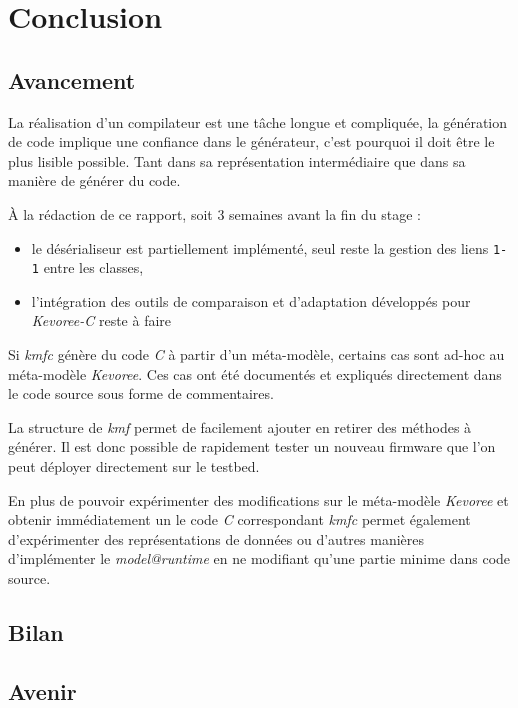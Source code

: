 \section*{Conclusion}
{}


\subsection*{Avancement}
{}
La réalisation d'un compilateur est une tâche longue et compliquée, la génération de code implique une confiance dans le générateur, c'est pourquoi il doit être le plus lisible possible. Tant dans sa représentation intermédiaire que dans sa manière de générer du code.

À la rédaction de ce rapport, soit 3 semaines avant la fin du stage :
\begin{itemize}
\item le désérialiseur est partiellement implémenté, seul reste la gestion des liens \texttt{1-1} entre les classes,
\item l'intégration des outils de comparaison et d'adaptation développés pour \emph{Kevoree-C} reste à faire
\end{itemize}

Si \emph{kmfc} génère du code \emph{C} à partir d'un méta-modèle, certains cas sont ad-hoc au méta-modèle \emph{Kevoree}. Ces cas ont été documentés et expliqués directement dans le code source sous forme de commentaires.

La structure de \emph{kmf} permet de facilement ajouter en retirer des méthodes à générer. Il est donc possible de rapidement tester un nouveau firmware que l'on peut déployer directement sur le testbed.

En plus de pouvoir expérimenter des modifications sur le méta-modèle \emph{Kevoree} et obtenir immédiatement un le code \emph{C} correspondant \emph{kmfc} permet également d'expérimenter des représentations de données ou d'autres manières d'implémenter le \emph{model@runtime} en ne modifiant qu'une partie minime dans code source.

\subsection*{Bilan}
{}

\subsection*{Avenir}
{}
